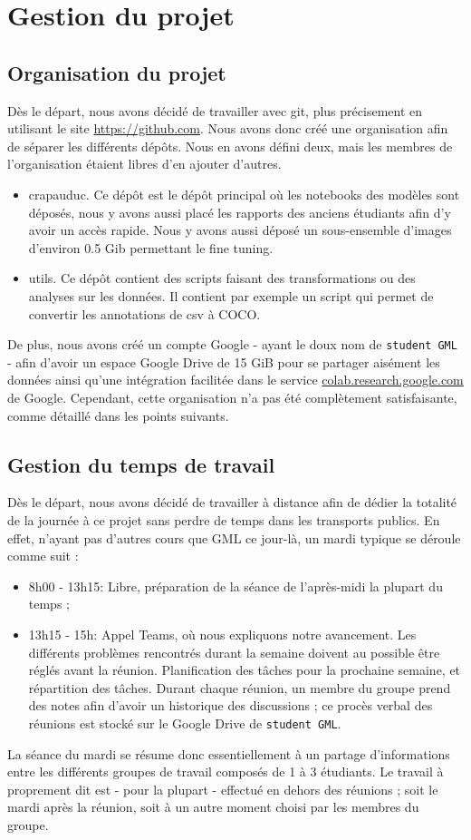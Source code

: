 \chapter{Gestion du projet}
\section{Organisation du projet}
Dès le départ, nous avons décidé de travailler avec git, plus précisement 
en utilisant le site \url{https://github.com}. Nous avons donc créé une organisation afin de séparer les différents dépôts. Nous en avons défini deux, mais les membres de l'organisation étaient libres d'en ajouter d'autres.
\begin{itemize}
    \item crapauduc. Ce dépôt est le dépôt principal où les notebooks des modèles sont déposés, nous y avons aussi placé les rapports des anciens étudiants afin d'y avoir un accès rapide. Nous y avons aussi déposé un sous-ensemble d'images d'environ 0.5 Gib permettant le fine tuning.
    \item utils. Ce dépôt contient des scripts faisant des transformations ou des analyses sur les données. Il contient par exemple un script qui permet de convertir les annotations de csv à COCO.
\end{itemize}

De plus, nous avons créé un compte Google - ayant le doux nom de \verb|student GML| - afin d'avoir un espace Google Drive de 15 GiB pour se partager aisément les données ainsi qu'une intégration facilitée dans le service \url{colab.research.google.com} de Google. Cependant, cette organisation n'a pas été complètement satisfaisante, comme détaillé dans les points suivants.


\section{Gestion du temps de travail}
Dès le départ, nous avons décidé de travailler à distance afin de dédier 
la totalité de la journée à ce projet sans perdre de temps dans les transports publics. En effet, n'ayant pas d'autres cours que GML ce jour-là, un mardi typique se déroule comme suit :
\begin{itemize}
    \item 8h00 - 13h15: Libre, préparation de la séance de l'après-midi la plupart du temps ;
    \item 13h15 - 15h: Appel Teams, où nous expliquons notre avancement. Les différents problèmes rencontrés durant la semaine doivent au possible être réglés avant la réunion. Planification des tâches pour la prochaine semaine, et répartition des tâches. Durant chaque réunion, un membre du groupe prend des notes afin d'avoir un historique des discussions ; ce procès verbal des réunions est stocké sur le Google Drive de \verb|student GML|.
    \label{item:seance}
\end{itemize}
La séance du mardi se résume donc essentiellement à un partage d'informations entre les différents groupes de travail composés de 1 à 3 étudiants. Le travail à proprement dit est - pour la plupart - effectué en dehors des réunions ; soit le mardi après la réunion, soit à un autre moment choisi par les membres du groupe.

